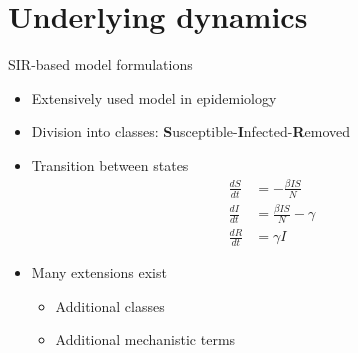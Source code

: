 \documentclass[10pt]{beamer}
\begin{document}
	\section{Underlying dynamics}

		\begin{frame}[allowframebreaks]{SIR-based model formulations}

			\begin{itemize}
				\item Extensively used model in epidemiology
				\item Division into classes: {\bf S}usceptible-{\bf I}nfected-{\bf R}emoved
				\item Transition between states
					\begin{equation*}
						\begin{array}{rl}
							\frac{dS}{dt} & = - \frac{\beta I S}{N} \\
							\frac{dI}{dt} & = \frac{\beta I S}{N} - \gamma  \\
							\frac{dR}{dt} & = \gamma I
						\end{array}
					\end{equation*}
				\item Many extensions exist
				\begin{itemize}
					\item Additional classes
					\item Additional mechanistic terms
				\end{itemize}
			\end{itemize}


\end{frame}
\end{document}
